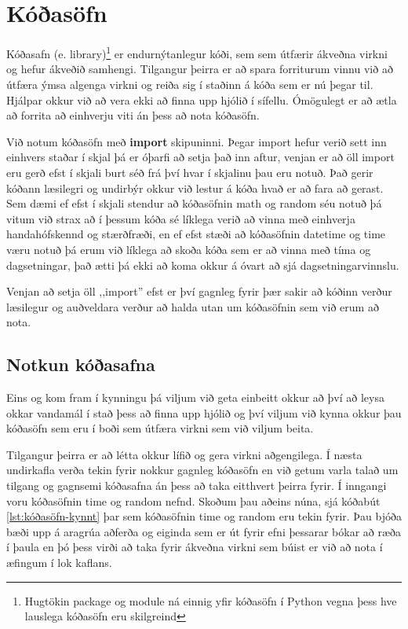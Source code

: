 
\chapter{Kóðasöfn}\label{k:import}
Kóðasafn (e. library)\footnote{Hugtökin package og module ná einnig yfir kóðasöfn í Python vegna þess hve lauslega kóðasöfn eru skilgreind} er endurnýtanlegur kóði, sem sem útfærir ákveðna virkni og hefur ákveðið samhengi.
Tilgangur þeirra er að spara forriturum vinnu við að útfæra ýmsa algenga virkni og reiða sig í staðinn á kóða sem er nú þegar til.
Hjálpar okkur við að vera ekki að finna upp hjólið í sífellu.
Ómögulegt er að ætla að forrita að einhverju viti án þess að nota kóðasöfn.

Við notum kóðasöfn með \textbf{import} skipuninni. 
Þegar import hefur verið sett inn einhvers staðar í skjal þá er óþarfi að setja það inn aftur, venjan er að öll import eru gerð efst í skjali burt séð frá því hvar í skjalinu þau eru notuð.
Það gerir kóðann læsilegri og undirbýr okkur við lestur á kóða hvað er að fara að gerast.
Sem dæmi ef efst í skjali stendur að kóðasöfnin math og random séu notuð þá vitum við strax að í þessum kóða sé líklega verið að vinna með einhverja handahófskennd og stærðfræði, en ef efst stæði að kóðasöfnin datetime og time væru notuð þá erum við líklega að skoða kóða sem er að vinna með tíma og dagsetningar, það ætti þá ekki að koma okkur á óvart að sjá dagsetningarvinnslu.

Venjan að setja öll ,,import'' efst er því gagnleg fyrir þær sakir að kóðinn verður læsilegur og auðveldara verður að halda utan um kóðasöfnin sem við erum að nota.

\section{Notkun kóðasafna}\label{uk:kóðasöfn-kynnt}
Eins og kom fram í kynningu þá viljum við geta einbeitt okkur að því að leysa okkar vandamál í stað þess að finna upp hjólið og því viljum við kynna okkur þau kóðasöfn sem eru í boði sem útfæra virkni sem við viljum beita.

Tilgangur þeirra er að létta okkur lífið og gera virkni aðgengilega.
Í næsta undirkafla verða tekin fyrir nokkur gagnleg kóðasöfn en við getum varla talað um tilgang og gagnsemi kóðasafna án þess að taka eitthvert þeirra fyrir.
Í inngangi voru kóðasöfnin time og random nefnd.
Skoðum þau aðeins núna, sjá kóðabút \ref{lst:kóðasöfn-kynnt} þar sem kóðasöfnin time og random eru tekin fyrir.
Þau bjóða bæði upp á aragrúa aðferða og eiginda sem er út fyrir efni þessarar bókar að ræða í þaula en þó þess virði að taka fyrir ákveðna virkni sem búist er við að nota í æfingum í lok kaflans. 
